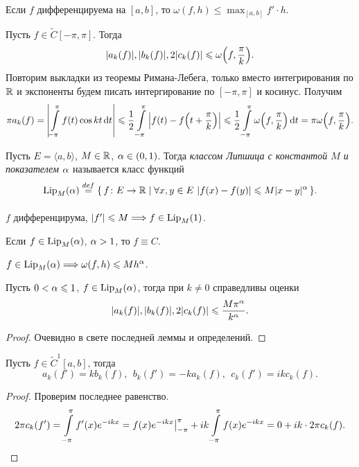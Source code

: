 \begin{remark}
    Если $f$ дифференцируема на $[a, b]$, то $\omega(f, h) \leqslant \max_{[a, b]}{f'} \cdot h$.
\end{remark}

\begin{lemma}
    Пусть $f \in \widetilde{C}[-\pi, \pi]$. Тогда
    \[
        |a_k(f)|, |b_k(f)|, 2|c_k(f)| \leqslant \omega\parens*{f, \frac{\pi}{k}}
    .\]
    Повторим выкладки из теоремы Римана-Лебега, только вместо интегрирования по $\mathbb{R}$
    и экспоненты будем писать интергирование по $[-\pi, \pi]$ и косинус. Получим
    \[
        \pi a_k(f) = \abs*{\intl_{-\pi}^\pi{f(t) \cos{kt} \dd t}} \leqslant \frac{1}{2}
        \intl_{-\pi}^\pi{\abs*{f(t) - f\parens*{t + \frac{\pi}{k}}}} \leqslant
        \frac{1}{2} \intl_{-\pi}^\pi{\omega\parens*{f, \frac{\pi}{k}}\dd t} =
        \pi \omega\parens*{f, \frac{\pi}{k}}
    .\]
\end{lemma}

\begin{definition}
    Пусть $E = \langle a, b \rangle$, $M \in \mathbb{R}$, $\alpha \in (0, 1)$. Тогда
    \textit{классом Липшица с константой $M$ и показателем $\alpha$}
    называется класс функций
    \[
        \operatorname{Lip}_M(\alpha) \overset{def}{\underset{}{=}} \{\, f\colon E \to \mathbb{R} \mid \forall x, y \in E~
        |f(x) - f(y)| \leqslant M |x - y|^\alpha \,\} 
    .\]
\end{definition}

\begin{remark}
    $f$ дифференцирума, $|f'| \leqslant M \Longrightarrow f \in \operatorname{Lip}_M(1)$.
\end{remark}

\begin{remark}
    Если $f \in \operatorname{Lip}_M(\alpha)$, $\alpha > 1$, то $f \equiv C$.
\end{remark}

\begin{remark}
    $f \in \operatorname{Lip}_M(\alpha) \Longrightarrow \omega(f, h) \leqslant M h^\alpha$.
\end{remark}

\begin{corollary}
    Пусть $0 < \alpha \leqslant 1$, $f \in \operatorname{Lip}_M(\alpha)$, тогда при $k \neq 0$
    справедливы оценки
    \[
        |a_k(f)|, |b_k(f)|, 2|c_k(f)| \leqslant \frac{M \pi^\alpha}{k^\alpha}
    .\]
\end{corollary}
\begin{proof}
    Очевидно в свете последней леммы и определений.
\end{proof}

\begin{lemma}
    Пусть $f \in \widetilde{C}^1[a, b]$, тогда
    \[
        a_k(f') = k b_k(f),~~ b_k(f') = -k a_k(f),~~ c_k(f') = ik c_k(f)
    .\]
\end{lemma}
\begin{proof}
    Проверим последнее равенство.
    \[
        2 \pi c_k(f') = \int\limits_{-\pi}^\pi{f'(x) e^{-ikx}} = f(x) e^{-ikx}\big|_{-\pi}^\pi +
        ik \int\limits_{-\pi}^\pi{f(x) e^{-ikx}} = 0 + ik \cdot 2 \pi c_k(f)
    .\]
\end{proof}

